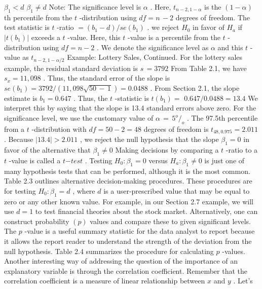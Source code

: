 \documentclass[11pt]{article}
\begin{document}
\(\beta_{1} < d\)
\(\beta_{1} \neq d\)
Note: The significance level is \(\alpha\) . Here, \(t_{n-2 , 1-\alpha}\) is the \(( 1-\alpha)\) th percentile
 from the \(t\) -distribution using \(d f=n \,-2\) degrees of freedom. The test statistic
is \(t\) -ratio \(= ( b_{1}-d ) / s e ( b_{1} )\) .
we reject \(H_{0}\) in favor of \(H_{a}\) if \(\left| t ( b_{1} ) \right|\) exceeds a \(t\) -value. Here, this \(t\) -value is a
 percentile from the \(t\) -distribution using \(d f=n-2\) . We denote the significance
level as \(\alpha\) and this \(t\) -value as \(t_{n-2 , 1-\alpha/ 2}\)
Example: Lottery Sales, Continued. For the lottery sales example, the residual
 standard deviation is \(s \,=3 7 9 2\) From Table 2.1, we have \(s_{x}=1 1 , 0 9 8\) . Thus, the
standard error of the slope is \(s e ( b_{1} )=3 7 9 2 / ( {1 1} {\mathrm{,} 0 9 8} \sqrt{5 0 \,-\, 1} )=0 . 0 4 8 8\) . From
Section 2.1, the slope estimate is \(b_{1}=0 . 6 4 7\) . Thus, the \(t\) -statistic is \(t ( b_{1} )=\)
\(0 . 6 4 7 / 0 . 0 4 8 8=1 3 . 4\) We interpret this by saying that the slope is 13.4 standard
errors above zero. For the significance level, we use the customary value of
\(\alpha\,=\, 5^{o} \! /_{o}\) . The 97.5th percentile from a \(t\) -distribution with \(d f=5 0-2=4 8\)
 degrees of freedom is \(t_{4 8 , 0 . 9 7 5}=2 . 0 1 1\) . Because \(| 1 3 . 4 | > 2 . 0 1 1\) , we reject the
 null hypothesis that the slope \(\beta_{1}=0\) in favor of the alternative that \(\beta_{1} \neq0\)
 Making decisions by comparing a \(t\) -ratio to a \(t\) -value is called a \(t \mathrm{-} t e s t\) . Testing
\(H_{0} : \beta_{1}=0\) versus \(H_{a} : \beta_{1} \neq0\) is just one of many hypothesis tests that can
be performed, although it is the most common. Table 2.3 outlines alternative
 decision-making procedures. These procedures are for testing \(H_{0} : \beta_{1}=d\) , where
\(d\) is a user-prescribed value that may be equal to zero or any other known value.
For example, in our Section 2.7 example, we will use \({d=1}\) to test financial
 theories about the stock market.
Alternatively, one can construct probability \(\left( p \right)\) values and compare these to
given significant levels. The \(p\) -value is a useful summary statistic for the data
 analyst to report because it allows the report reader to understand the strength of
 the deviation from the null hypothesis. Table 2.4 summarizes the procedure for
 calculating \(p\) -values.
 Another interesting way of addressing the question of the importance of an
explanatory variable is through the correlation coefficient. Remember that the
 correlation coefficient is a measure of linear relationship between \(x\) and \(y\) . Let's
\end{document}
